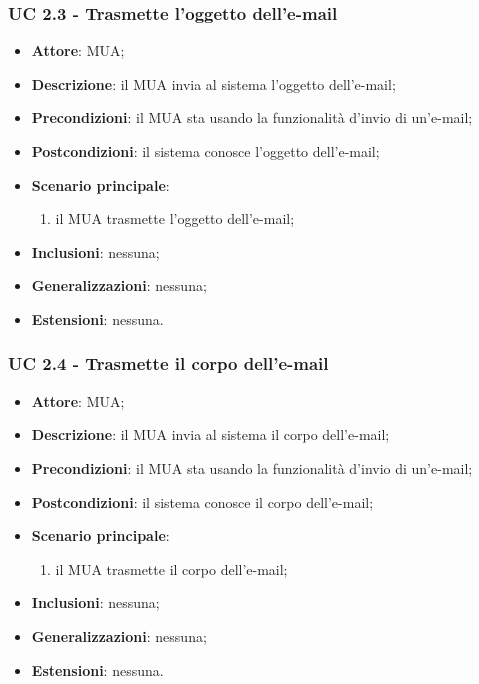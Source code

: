     \subsubsection{UC 2.3 - Trasmette l'oggetto dell'e-mail} \label{sec:UC2.3}
    \begin{itemize}
        \item \textbf{Attore}: MUA;
        \item \textbf{Descrizione}: il MUA invia al sistema l'oggetto dell'e-mail;
        \item \textbf{Precondizioni}: il MUA sta usando la funzionalità d'invio di un'e-mail;
        \item \textbf{Postcondizioni}: il sistema conosce l'oggetto dell'e-mail;
        \item \textbf{Scenario principale}:
            \begin{enumerate}
                \item il MUA trasmette l'oggetto dell'e-mail;
            \end{enumerate}
        \item \textbf{Inclusioni}: nessuna;
        \item \textbf{Generalizzazioni}: nessuna;
        \item \textbf{Estensioni}: nessuna.
    \end{itemize}

    \subsubsection{UC 2.4 - Trasmette il corpo dell'e-mail} \label{sec:UC2.4}
    \begin{itemize}
        \item \textbf{Attore}: MUA;
        \item \textbf{Descrizione}: il MUA invia al sistema il corpo dell'e-mail;
        \item \textbf{Precondizioni}: il MUA sta usando la funzionalità d'invio di un'e-mail;
        \item \textbf{Postcondizioni}: il sistema conosce il corpo dell'e-mail;
        \item \textbf{Scenario principale}:
            \begin{enumerate}
                \item il MUA trasmette il corpo dell'e-mail;
            \end{enumerate}
        \item \textbf{Inclusioni}: nessuna;
        \item \textbf{Generalizzazioni}: nessuna;
        \item \textbf{Estensioni}: nessuna.
    \end{itemize}



